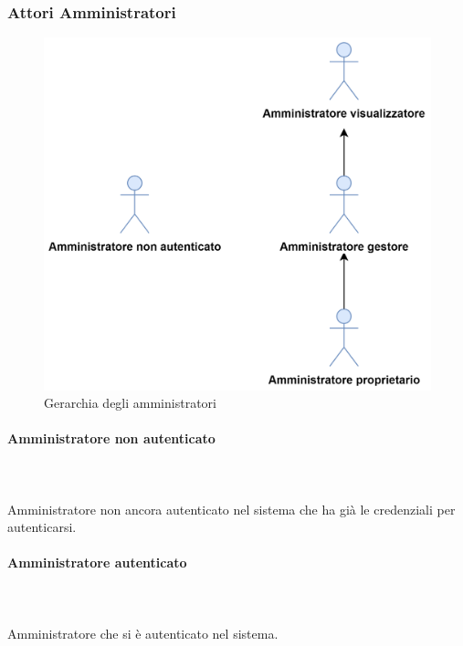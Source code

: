 \subsubsection{Attori Amministratori}
\begin{figure}[h]
  \caption{Gerarchia degli amministratori}
  \centering
    \includegraphics[scale=0.8]{Sezioni/UseCase/Immagini/Amministratori.png}
\end{figure}


\paragraph{Amministratore non autenticato}\mbox{}\\ \\
Amministratore non ancora autenticato nel sistema che ha già le credenziali per autenticarsi.
\paragraph{Amministratore autenticato}\mbox{}\\ \\
Amministratore che si è autenticato nel sistema.
